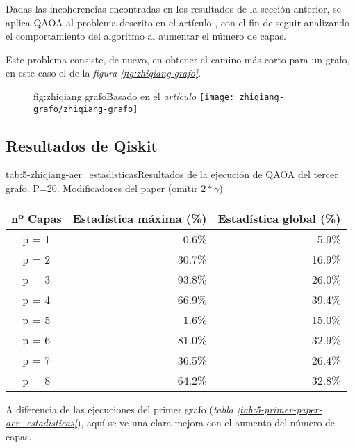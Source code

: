Dadas las incoherencias encontradas en los resultados de la sección anterior, se aplica QAOA al problema descrito en el artículo \cite{solving_shortest_path_with_qaoa}, con el fin de seguir analizando el comportamiento del algoritmo al aumentar el número de capas.

Este problema consiste, de nuevo, en obtener el camino más corto para un grafo, en este caso el de la \textit{figura \ref{fig:zhiqiang grafo}}.

\begin{figure}[htbp]{fig:zhiqiang grafo}{Basado en el \textit{artículo \cite{solving_shortest_path_with_qaoa}}}
  \centering
  \texttt{[image: zhiqiang-grafo/zhiqiang-grafo]}
\end{figure}

\subsection{Resultados de Qiskit}
\begin{table}[htbp]{tab:5-zhiqiang-aer_estadisticas}{Resultados de la ejecución de QAOA del tercer grafo. P=20. Modificadores del paper (omitir \(2*\gamma\))}
  \centering
  \begin{tabular}{|c|r|r|}
    \hline
    \textbf{nº Capas} & \textbf{Estadística máxima (\%)} & \textbf{Estadística global (\%)} \\ \hline
    p = 1 &  0.6\% &  5.9\% \\ \hline
    p = 2 & 30.7\% & 16.9\% \\ \hline
    p = 3 & 93.8\% & 26.0\% \\ \hline
    p = 4 & 66.9\% & 39.4\% \\ \hline  %
    p = 5 &  1.6\% & 15.0\% \\ \hline  %
    p = 6 & 81.0\% & 32.9\% \\ \hline
    p = 7 & 36.5\% & 26.4\% \\ \hline
    p = 8 & 64.2\% & 32.8\% \\ \hline
  \end{tabular}
\end{table}

A diferencia de las ejecuciones del primer grafo (\textit{tabla \ref{tab:5-primer-paper-aer_estadisticas}}), aquí se ve una clara mejora con el aumento del número de capas.


